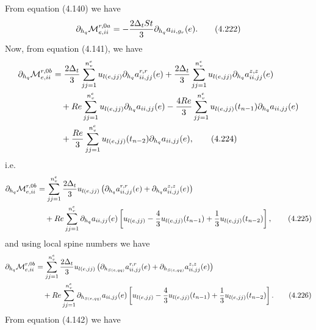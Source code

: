 \documentclass{article}
\begin{document}
From equation (4.140) we have
\begin{equation}
\partial_{h_q}\mathcal{M}_{e,ii}^{r,0a} = -\frac{2\Delta_t St}{3} \partial_{h_q} a_{ii,g_r}(e). \tag{4.222}
\end{equation}
Now, from equation (4.141), we have
\begin{align}
\partial_{h_q}\mathcal{M}_{e,ii}^{r,0b} &= \frac{2\Delta_t}{3} \sum_{jj=1}^{n_v^e} u_{l(e,jj)} \partial_{h_q} a_{ii,jj}^{r,r}(e) 
+ \frac{2\Delta_t}{3} \sum_{jj=1}^{n_v^e} u_{l(e,jj)} \partial_{h_q} a_{ii,jj}^{z,z}(e) \nonumber\\
&\quad + Re \sum_{jj=1}^{n_v^e} u_{l(e,jj)} \partial_{h_q} a_{ii,jj}(e) 
- \frac{4Re}{3} \sum_{jj=1}^{n_v^e} u_{l(e,jj)}(t_{n-1}) \partial_{h_q} a_{ii,jj}(e) \nonumber\\
&\quad + \frac{Re}{3} \sum_{jj=1}^{n_v^e} u_{l(e,jj)}(t_{n-2}) \partial_{h_q} a_{ii,jj}(e), \tag{4.224}
\end{align}
i.e.
\begin{align}
\partial_{h_q}\mathcal{M}_{e,ii}^{r,0b} &= \sum_{jj=1}^{n_v^e} \frac{2\Delta_t}{3} u_{l(e,jj)} \left( \partial_{h_q} a_{ii,jj}^{r,r}(e) + \partial_{h_q} a_{ii,jj}^{z,z}(e) \right) \nonumber\\
&\quad + Re \sum_{jj=1}^{n_v^e} \partial_{h_q} a_{ii,jj}(e) \left[ u_{l(e,jj)} - \frac{4}{3} u_{l(e,jj)}(t_{n-1}) + \frac{1}{3} u_{l(e,jj)}(t_{n-2}) \right], \tag{4.225}
\end{align}
and using local spine numbers we have
\begin{align}
\partial_{h_q}\mathcal{M}_{e,ii}^{r,0b} &= \sum_{jj=1}^{n_v^e} \frac{2\Delta_t}{3} u_{l(e,jj)} \left( \partial_{h_{S(e,qq)}} a_{ii,jj}^{r,r}(e) + \partial_{h_{S(e,qq)}} a_{ii,jj}^{z,z}(e) \right) \nonumber\\
&\quad + Re \sum_{jj=1}^{n_v^e} \partial_{h_{S(e,qq)}} a_{ii,jj}(e) \left[ u_{l(e,jj)} - \frac{4}{3} u_{l(e,jj)}(t_{n-1}) + \frac{1}{3} u_{l(e,jj)}(t_{n-2}) \right]. \tag{4.226}
\end{align}
From equation (4.142) we have
\end{document}
